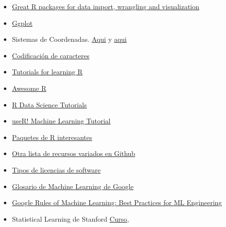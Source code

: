 \documentclass[]{article}
\begin{document}
\begin{itemize}
\item
  \href{http://www.computerworld.com/article/2921176/business-intelligence/great-r-packages-for-data-import-wrangling-visualization.html?idg_eid=96342b7ab1a902d39d1237b81a92554b\&email_SHA1_lc=\&cid=cw_nlt_computerworld_enterprise_apps_2017-06-23\&utm_source=Sailthru\&utm_medium=email\&utm_campaign=Computerworld\%20Enterprise\%20Apps\%202017-06-23\&utm_term=computerworld_enterprise_apps}{Great
  R packages for data import, wrangling and visualization}
\item
  \href{http://socviz.co/}{Ggplot}
\item
  Sistemas de Coordenadas.
  \href{http://rspatial.org/spatial/rst/6-crs.html}{Aqui} y
  \href{https://www.nceas.ucsb.edu/~frazier/RSpatialGuides/OverviewCoordinateReferenceSystems.pdf}{aqui}
\item
  \href{https://www.joelonsoftware.com/2003/10/08/the-absolute-minimum-every-software-developer-absolutely-positively-must-know-about-unicode-and-character-sets-no-excuses/}{Codificación
  de caracteres}
\item
  \href{https://www.r-bloggers.com/how-to-learn-r-2/}{Tutorials for
  learning R}
\item
  \href{https://github.com/qinwf/awesome-R}{Awesome R}
\item
  \href{https://github.com/ujjwalkarn/DataScienceR}{R Data Science
  Tutorials}
\item
  \href{https://github.com/ledell/useR-machine-learning-tutorial}{useR!
  Machine Learning Tutorial}
\item
  \href{https://www.computerworld.com/article/2921176/business-intelligence/great-r-packages-for-data-import-wrangling-visualization.html?utm_content=bufferf197d\&utm_medium=social\&utm_source=linkedin.com\&utm_campaign=buffer}{Paquetes
  de R interesantes}
\item
  \href{https://github.com/Shujian2015/FreeML}{Otra lista de recursos
  variados en Github}
\item
  \href{https://choosealicense.com/licenses/}{Tipos de licencias de
  software}
\item
  \href{https://developers.google.com/machine-learning/glossary/}{Glosario
  de Machine Learning de Google}
\item
  \href{http://martin.zinkevich.org/rules_of_ml/rules_of_ml.pdf}{Google
  Rules of Machine Learning: Best Practices for ML Engineering}
\item
  Statistical Learning de Stanford
  \href{https://lagunita.stanford.edu/courses/HumanitiesSciences/StatLearning/Winter2016/about}{Curso},

\end{itemize}
\end{document}
